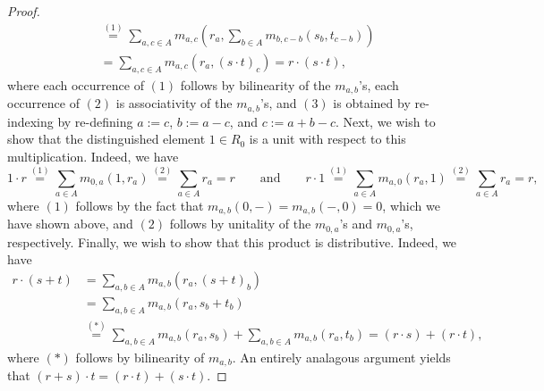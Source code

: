 \documentclass[../main.tex]{subfiles}
\begin{document}
\begin{proof}
\begin{align*}
		&\overset{(1)}=\sum_{a,c\in A}m_{a,c}\left(r_a,\sum_{b\in A}m_{b,c-b}(s_b,t_{c-b})\right) \\
		&=\sum_{a,c\in A}m_{a,c}(r_a,(s\cdot t)_c)=r\cdot(s\cdot t),
	\end{align*}
	where each occurrence of $(1)$ follows by bilinearity of the $m_{a,b}$'s, each occurrence of $(2)$ is associativity of the $m_{a,b}$'s, and $(3)$ is obtained by re-indexing by re-defining $a:=c$, $b:=a-c$, and $c:=a+b-c$. Next, we wish to show that the distinguished element $1\in R_0$ is a unit with respect to this multiplication. Indeed, we have
	\[1\cdot r\overset{(1)}=\sum_{a\in A}m_{0,a}(1,r_a)\overset{(2)}=\sum_{a\in A}r_a=r\qquad\text{and}\qquad r\cdot 1\overset{(1)}=\sum_{a\in A}m_{a,0}(r_a,1)\overset{(2)}=\sum_{a\in A}r_a=r,\]
	where $(1)$ follows by the fact that $m_{a,b}(0,-)=m_{a,b}(-,0)=0$, which we have shown above, and $(2)$ follows by unitality of the $m_{0,a}$'s and $m_{0,a}$'s, respectively. Finally, we wish to show that this product is distributive. Indeed, we have
	\begin{align*}
		r\cdot(s+t)&=\sum_{a,b\in A}m_{a,b}(r_a,(s+t)_b) \\
		&=\sum_{a,b\in A}m_{a,b}(r_a,s_b+t_b) \\
		&\overset{(*)}=\sum_{a,b\in A}m_{a,b}(r_a,s_b)+\sum_{a,b\in A}m_{a,b}(r_a,t_b)=(r\cdot s)+(r\cdot t),
	\end{align*}
	where $(*)$ follows by bilinearity of $m_{a,b}$. An entirely analagous argument yields that $(r+s)\cdot t=(r\cdot t)+(s\cdot t)$.
\end{proof}
\end{document}
